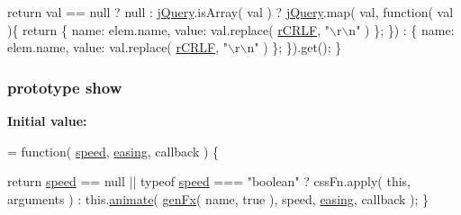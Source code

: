 \begin{DoxyCode}
            \textcolor{keywordflow}{return} val == null ?
                null :
                \hyperlink{jquery-1_810_82-vsdoc_8js_add5237586d970a38a81f990e8eb28c6c}{jQuery}.isArray( val ) ?
                    \hyperlink{jquery-1_810_82-vsdoc_8js_add5237586d970a38a81f990e8eb28c6c}{jQuery}.map( val, \textcolor{keyword}{function}( val )\{
                        \textcolor{keywordflow}{return} \{ name: elem.name, value: val.replace( \hyperlink{_bibabook_2_scripts_2jquery-1_810_82_8js_a4fd9dfc4eb645b441a3e84730c50154b}{rCRLF}, \textcolor{stringliteral}{"\(\backslash\)r\(\backslash\)n"} ) \};
                    \}) :
                    \{ name: elem.name, value: val.replace( \hyperlink{_bibabook_2_scripts_2jquery-1_810_82_8js_a4fd9dfc4eb645b441a3e84730c50154b}{rCRLF}, \textcolor{stringliteral}{"\(\backslash\)r\(\backslash\)n"} ) \};
        \}).\textcolor{keyword}{get}();
    \}
\end{DoxyCode}
\hypertarget{jquery-1_810_82-vsdoc_8js_a8dcdb81268297f0ecf76be5e6aebd05c}{}
\subsubsection[{show}]{ {\bf prototype} show}\label{jquery-1_810_82-vsdoc_8js_a8dcdb81268297f0ecf76be5e6aebd05c}
{\bfseries Initial value\+:}
\begin{DoxyCode}
= \textcolor{keyword}{function}( \hyperlink{jquery-1_810_82-vsdoc_8js_add98c90065e6563cba26ff6d2016c46c}{speed}, \hyperlink{jquery-1_810_82-vsdoc_8js_a9758a312629fa6de1744280dd6e6253b}{easing}, callback ) \{


        \textcolor{keywordflow}{return} \hyperlink{jquery-1_810_82-vsdoc_8js_add98c90065e6563cba26ff6d2016c46c}{speed} == null || typeof \hyperlink{jquery-1_810_82-vsdoc_8js_add98c90065e6563cba26ff6d2016c46c}{speed} === \textcolor{stringliteral}{"boolean"} ?
            cssFn.apply( \textcolor{keyword}{this}, arguments ) :
            this.\hyperlink{jquery-1_810_82-vsdoc_8js_a956a1d08128d41115c45b6815814a64d}{animate}( \hyperlink{_bibabook_2_scripts_2jquery-1_810_82_8js_a0dad9ae6c57fd32a071de202faa87081}{genFx}( name, \textcolor{keyword}{true} ), speed, \hyperlink{jquery-1_810_82-vsdoc_8js_a9758a312629fa6de1744280dd6e6253b}{easing}, callback );
    \}
\end{DoxyCode}
\hypertarget{jquery-1_810_82-vsdoc_8js_aab3156d09bb394a1adc703b3daa9a6e5}{}
